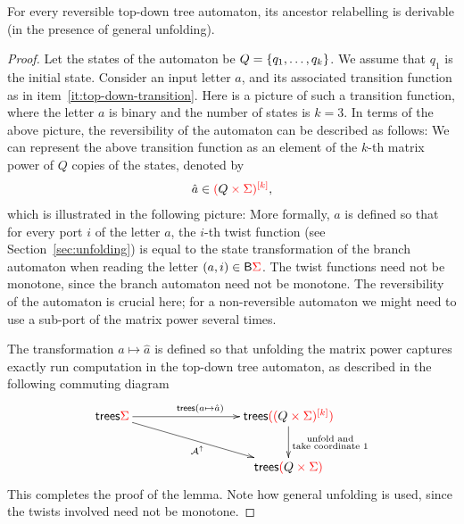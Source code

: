 \begin{lemma}
    For every reversible top-down tree automaton, its ancestor relabelling is derivable (in the presence of general unfolding).
\end{lemma}
\begin{proof}
    Let the states of the automaton be $Q = \set{q_1,\ldots,q_k}$. We assume that $q_1$ is the initial state.
    Consider an input letter $a$, and its associated transition function as in item~\ref{it:top-down-transition}. Here is a picture of such a transition function, where the letter $a$ is binary and the number of states is $k=3$.
    In terms of the above picture, the reversibility of the automaton can be described as follows:
    We can represent the above transition function as an element of the $k$-th matrix power of $Q$ copies of the states, denoted by 
    \begin{align*}
    \hat a \in \ranked{\mati k {(\black Q \times \rSigma)}},
    \end{align*}
    which is illustrated in the following picture:
    More formally, $\hat a$ is defined so that for every port $i$ of the letter $a$, the $i$-th twist function (see Section~\ref{sec:unfolding}) is equal to the state transformation of the branch automaton when reading the letter $(a,i) \in \branches \rSigma$. The twist functions need not be monotone, since the branch automaton need not be monotone. 
    The reversibility of the automaton is crucial here; for a non-reversible automaton we might need to use a sub-port of the matrix power several times. 

    The transformation $a \mapsto \hat a$ is defined so that unfolding the matrix power captures exactly run computation in the top-down tree automaton, as described in the following commuting  diagram
    \begin{align*}
    \xymatrix@C=3cm{
        \trees \rSigma \ar[r]^{\trees(a \mapsto \hat a)} \ar[dr]_{\Aa^\uparrow}& 
        \trees \ranked{(\mati k {(\black Q \times \rSigma)})} \ar[d]^{
            \substack{
                \text{unfold and}\\
                \text{take coordinate $1$}
            }}\\
        & \trees{\ranked{(\black Q \times \rSigma)}}
    }
    \end{align*}
This completes the proof of the lemma. Note how general unfolding is used, since the twists involved need not be monotone.
\end{proof}